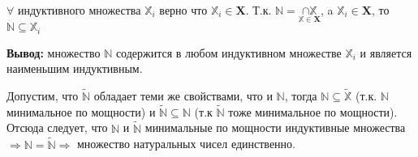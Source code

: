 \documentclass[class=article,a4paper,12pt,crop=false]{standalone}
\begin{document}
$\forall$ индуктивного множества $\mathbb{X}_i$ верно что
$\mathbb{X}_i \in \mathbf{X}$. Т.к.
$\mathbb{N} = \underset{\mathbb{X}\in \mathbf{X}}{\cap{\mathbb{X}}}$, a
$\mathbb{X}_i \in \mathbf{X}$, то $\mathbb{N} \subseteq \mathbb{X}_i$

\textbf{Вывод:} множество $\mathbb{N}$ содержится в любом индуктивном
множестве $\mathbb{X}_i$ и является наименьшим индуктивным.

Допустим, что $\tilde{\mathbb{N}}$ обладает теми же свойствами,
что и $\mathbb{N}$, тогда $\mathbb{N} \subseteq \tilde{\mathbb{X}}$
(т.к. $\mathbb{N}$ минимальное по мощности) и
$\tilde{\mathbb{N}} \subseteq \mathbb{N}$
(т.к $\tilde{\mathbb{N}}$ тоже минимальное по мощности).
Отсюда следует, что $\mathbb{N}$ и $\tilde{\mathbb{N}}$
минимальные по мощности индуктивные множества
$\Rightarrow \mathbb{N} = \tilde{\mathbb{N}} \Rightarrow$
множество натуральных чисел единственно.
\end{document}
